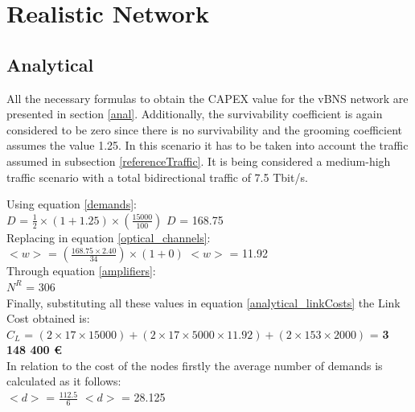 \clearpage
\section{Realistic Network}
\label{heu}

\subsection{Analytical}
\vspace{11pt}
All the necessary formulas to obtain the CAPEX value for the vBNS network are presented in section \ref{anal}. Additionally, the survivability coefficient is again considered to be zero since there is no survivability and the grooming coefficient assumes the value 1.25. In this scenario it has to be taken into account the traffic assumed in subsection \ref{referenceTraffic}. It is being considered a medium-high traffic scenario with a total bidirectional traffic of 7.5 Tbit/s.

Using equation \ref{demands}:\\

$D$ = ${\frac{1}{2}} \times {( 1 + 1.25 )} \times ( \frac{15000}{100} )$ \qquad \qquad $D$ = 168.75\\

Replacing in equation \ref{optical_channels}:\\

$<w>$ = $(\frac{168.75 \times 2.40}{34} ) \times ( 1 + 0)$ \qquad \qquad $<w>$ = 11.92\\

Through equation \ref{amplifiers}:\\

$N^R$ = 306\\

Finally, substituting all these values in equation \ref{analytical_linkCosts} the Link Cost obtained is:\\

$C_L$ = $(2 \times 17 \times 15 000) + (2 \times 17 \times 5 000 \times 11.92) + (2 \times 153 \times 2000)$ = \textbf{3 148 400 \euro}\\

In relation to the cost of the nodes firstly the average number of demands is calculated as it follows:\\

$<d>$ = $\frac{112.5}{6}$ \qquad \qquad $<d>$ = 28.125\\

